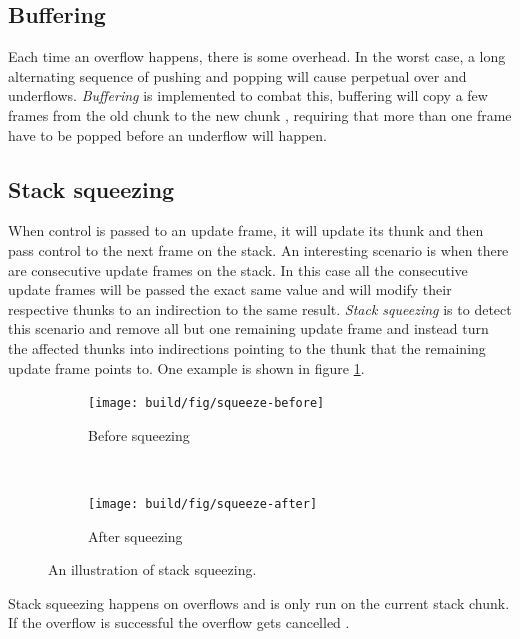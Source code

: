 \subsection{Buffering}

Each time an overflow happens, there is some overhead. In the worst
case, a long alternating sequence of pushing and popping will cause
perpetual over and underflows. \emph{Buffering} is implemented to combat this,
buffering will copy a few frames from the old chunk to the new chunk
\cite{github_stack_buffering}, requiring that more than one frame have
to be popped before an underflow will happen.

\subsection{Stack squeezing}

When control is passed to an update frame, it will update its thunk and
then pass control to the next frame on the stack. An interesting scenario
is when there are consecutive update frames on the stack. In this case
all the consecutive update frames will be passed the exact same value
and will modify their respective thunks to an indirection to the same result.
\emph{Stack squeezing}
is to detect this scenario and remove all but one remaining update frame
and instead turn the affected thunks into indirections pointing to the
thunk that the remaining update frame points to. One example
is shown in figure \ref{fig:stack_squeezing}. \cite{github_thread_paused}

\begin{figure}
\begin{mdframed}
  \begin{subfigure}[t]{0.5\textwidth}
    \texttt{[image: build/fig/squeeze-before]}
    \caption{Before squeezing}
  \end{subfigure}
        ~ %
  \begin{subfigure}[t]{0.5\textwidth}
    \texttt{[image: build/fig/squeeze-after]}
    \caption{After squeezing}
  \end{subfigure}
  \caption{An illustration of stack squeezing.
  }\label{fig:stack_squeezing}
\end{mdframed}
\end{figure}

Stack squeezing happens on overflows and is only run on the current
stack chunk. If the overflow is successful the overflow gets cancelled
\cite{github_return_if_squeezed}.
